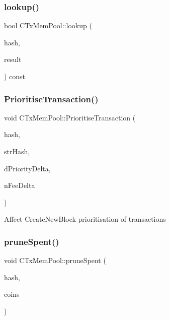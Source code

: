 \subsubsection{\texorpdfstring{lookup()}{lookup()}}
{\footnotesize\ttfamily bool C\+Tx\+Mem\+Pool\+::lookup (\begin{DoxyParamCaption}\item[{\mbox{\hyperlink{classuint256}{uint256}}}]{hash,  }\item[{C\+Transaction \&}]{result }\end{DoxyParamCaption}) const}

\mbox{\label{class_c_tx_mem_pool_a1a0a00279c941051af1b74c5ebeac40d}} 
\subsubsection{\texorpdfstring{Prioritise\+Transaction()}{PrioritiseTransaction()}}
{\footnotesize\ttfamily void C\+Tx\+Mem\+Pool\+::\+Prioritise\+Transaction (\begin{DoxyParamCaption}\item[{const \mbox{\hyperlink{classuint256}{uint256}}}]{hash,  }\item[{const std\+::string}]{str\+Hash,  }\item[{double}]{d\+Priority\+Delta,  }\item[{const \mbox{\hyperlink{amount_8h_a4eaf3a5239714d8c45b851527f7cb564}{C\+Amount}} \&}]{n\+Fee\+Delta }\end{DoxyParamCaption})}

Affect Create\+New\+Block prioritisation of transactions \mbox{\label{class_c_tx_mem_pool_ad6142b7cd3a58dae6cdaf03551c2f989}} 
\subsubsection{\texorpdfstring{prune\+Spent()}{pruneSpent()}}
{\footnotesize\ttfamily void C\+Tx\+Mem\+Pool\+::prune\+Spent (\begin{DoxyParamCaption}\item[{const \mbox{\hyperlink{classuint256}{uint256}} \&}]{hash,  }\item[{\mbox{\hyperlink{class_c_coins}{C\+Coins}} \&}]{coins }\end{DoxyParamCaption})}

